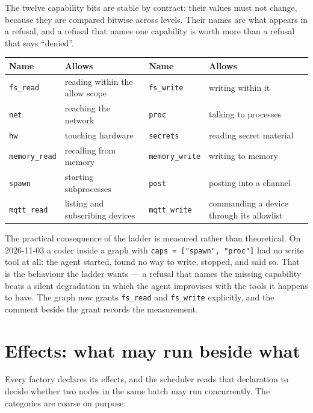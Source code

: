 The twelve capability bits are stable by contract: their values must not change, because they are
compared bitwise across levels. Their names are what appears in a refusal, and a refusal that names
one capability is worth more than a refusal that says \enquote{denied}.

\begin{center}
\footnotesize
\begin{tabular}{@{}p{}p{}p{}p{}@{}}
	\toprule
	\textbf{Name} & \textbf{Allows} & \textbf{Name} & \textbf{Allows} \\
	\midrule
	\texttt{fs\_read} & reading within the allow scope & \texttt{fs\_write} & writing within it \\
	\texttt{net} & reaching the network & \texttt{proc} & talking to processes \\
	\texttt{hw} & touching hardware & \texttt{secrets} & reading secret material \\
	\texttt{memory\_read} & recalling from memory & \texttt{memory\_write} & writing to memory \\
	\texttt{spawn} & starting subprocesses & \texttt{post} & posting into a channel \\
	\texttt{mqtt\_read} & listing and subscribing devices & \texttt{mqtt\_write} & commanding a
	device through its allowlist \\
	\bottomrule
\end{tabular}
\end{center}

The practical consequence of the ladder is measured rather than theoretical. On 2026-11-03 a coder
inside a graph with \texttt{caps = ["spawn", "proc"]} had no write tool at all: the agent started,
found no way to write, stopped, and said so. That is the behaviour the ladder wants --- a refusal
that names the missing capability beats a silent degradation in which the agent improvises with the
tools it happens to have. The graph now grants \texttt{fs\_read} and \texttt{fs\_write} explicitly,
and the comment beside the grant records the measurement.

\section{Effects: what may run beside what}

Every factory declares its effects, and the scheduler reads that declaration to decide whether two
nodes in the same batch may run concurrently. The categories are coarse on purpose:

